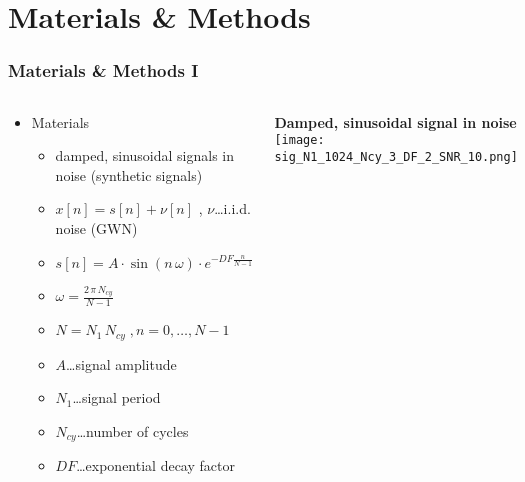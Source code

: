 \documentclass[11pt,aspectratio=169]{beamer}
\begin{document}
	\section{Materials \& Methods}
	\begin{frame}
		\frametitle{Materials \& Methods I}
		\begin{columns}
			\begin{RIPcolleft}
				\begin{itemize}
					\setlength\itemsep{0.5em}
					\item \textcolor{RIPtitlecol}{Materials}
					\begin{itemize}
						\setlength\itemsep{0.5em}
						\item damped, sinusoidal signals in noise (synthetic signals)
						\item $x[n] = s[n] + \nu[n]$ , $\nu$\ldots i.i.d. noise (GWN)
						\item $s[n] = A \cdot \sin(n \, \omega) \cdot e^{-DF \frac{n}{N-1}}$
						\item $\omega = \frac{2 \, \pi \, N_{cy}}{N-1}$
						\item $N = N_1 \, N_{cy} \; , n = 0,\ldots,N-1$
						\item $A$\ldots signal amplitude
						\item $N_1$\ldots signal period
						\item $N_{cy}$\ldots number of cycles
						\item $DF$\ldots exponential decay factor
					\end{itemize}
				\end{itemize}
			\end{RIPcolleft}
			\begin{RIPcolright}
				\textbf{Damped, sinusoidal signal in noise}\\
				\vspace{1em}
				\texttt{[image: sig\_N1\_1024\_Ncy\_3\_DF\_2\_SNR\_10.png]}
			\end{RIPcolright}
		\end{columns}
	\end{frame}
\end{document}
